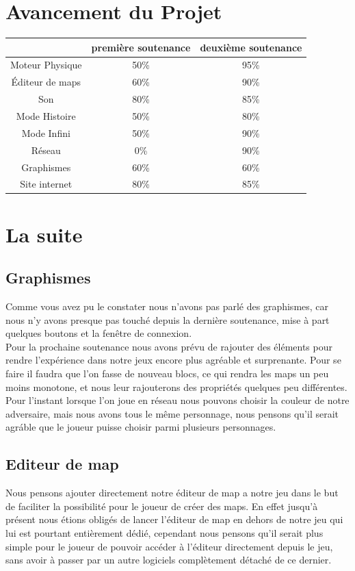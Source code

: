 \documentclass [11pt]{report}
\begin{document}
\chapter{Avancement du Projet}
	\renewcommand{\arraystretch}{2}
	\setlength{\tabcolsep}{0.7cm}
	\begin{tabular}{|c|c|c|}
	\hline  & premi\`ere soutenance & deuxi\`eme soutenance\\ 
	\hline Moteur Physique & 50\% & 95\% \\ 
	\hline \'Editeur de maps & 60\% & 90\% \\ 
	\hline Son & 80\% & 85\% \\ 
	\hline Mode Histoire & 50\% &  80\%\\ 
	\hline Mode Infini & 50\% & 90\% \\ 
	\hline Réseau &  0\% & 90\% \\ 
	\hline Graphismes & 60\% & 60\% \\ 
	\hline Site internet & 80\% & 85\% \\ 
	\hline
	\end{tabular} 
	
	
	
	
\chapter{La suite}
	\section{Graphismes}
		Comme vous avez pu le constater nous n'avons pas parl\'e des graphismes, car nous n'y avons presque pas touch\'e depuis la derni\`ere soutenance, mise \`a part quelques boutons et la fen\^etre de connexion. \\
	
		Pour la prochaine soutenance nous avons pr\'evu de rajouter des \'el\'ements  pour rendre l'exp\'erience dans notre jeux encore plus agr\'eable et surprenante. Pour se faire il faudra que l'on fasse de nouveau blocs, ce qui rendra les maps un peu moins monotone, et nous leur rajouterons des propri\'et\'es quelques peu diff\'erentes.\\
	
		Pour l'instant lorsque l'on joue en r\'eseau nous pouvons choisir la couleur de notre adversaire, mais nous avons tous le m\^eme personnage, nous pensons qu'il serait agr\'able que le joueur puisse choisir parmi plusieurs personnages.
	
	\section{Editeur de map}
		Nous pensons ajouter directement notre éditeur de map a notre jeu dans le but de faciliter la possibilité pour le joueur de créer des maps. En effet jusqu'à présent nous étions obligés de lancer l'éditeur de map en dehors de notre jeu qui lui est pourtant entièrement dédié, cependant nous pensons qu'il serait plus simple pour le joueur de pouvoir accéder à l'éditeur directement depuis le jeu, sans avoir à passer par un autre logiciels complètement détaché de ce dernier. 
		
\end{document}
